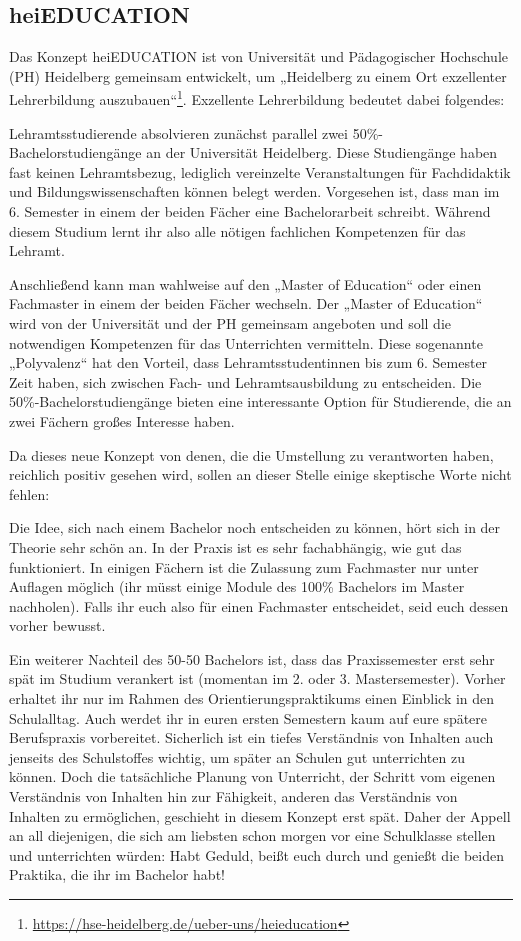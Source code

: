 \subsection{heiEDUCATION}

Das Konzept heiEDUCATION ist von Universität und Pädagogischer Hochschule (PH) Heidelberg gemeinsam entwickelt, um „Heidelberg zu einem Ort exzellenter Lehrerbildung auszubauen“\footnote{\url{https://hse-heidelberg.de/ueber-uns/heieducation}}. Exzellente Lehrerbildung bedeutet dabei folgendes:

Lehramtsstudierende absolvieren zunächst parallel zwei 50\%-Ba\-che\-lor\-stu\-di\-en\-gän\-ge an der Universität Heidelberg. Diese Studiengänge haben fast keinen Lehramtsbezug, lediglich vereinzelte Veranstaltungen für Fachdidaktik und Bildungswissenschaften können belegt werden. Vorgesehen ist, dass man im 6. Semester in einem der beiden Fächer eine Bachelorarbeit schreibt. Während diesem Studium lernt ihr also alle nötigen fachlichen Kompetenzen für das Lehramt.

Anschließend kann man wahlweise auf den „Master of Education“ oder einen Fachmaster in einem der beiden Fächer wechseln. Der „Master of Education“ wird von der Universität und der PH gemeinsam angeboten und soll die notwendigen Kompetenzen für das Unterrichten vermitteln. Diese sogenannte „Polyvalenz“ hat den Vorteil, dass Lehramtsstudentinnen bis zum 6. Semester Zeit haben, sich zwischen Fach- und Lehramtsausbildung zu entscheiden. Die 50\%-Bachelorstudiengänge bieten eine interessante Option für Studierende, die an zwei Fächern großes Interesse haben.

Da dieses neue Konzept von denen, die die Umstellung zu verantworten haben, reichlich positiv gesehen wird, sollen an dieser Stelle einige skeptische Worte nicht fehlen:

Die Idee, sich nach einem Bachelor noch entscheiden zu können, hört sich in der Theorie sehr schön an. In der Praxis ist es sehr fachabhängig, wie gut das funktioniert. In einigen Fächern ist die Zulassung zum Fachmaster nur unter Auflagen möglich (\dah ihr müsst einige Module des 100\% Bachelors im Master nachholen). Falls ihr euch also für einen Fachmaster entscheidet, seid euch dessen vorher bewusst.

Ein weiterer Nachteil des 50-50 Bachelors ist, dass das Praxissemester erst sehr spät im Studium verankert ist (momentan im 2. oder 3. Mastersemester). Vorher erhaltet ihr nur im Rahmen des Orientierungspraktikums einen Einblick in den Schulalltag. Auch werdet ihr in euren ersten Semestern kaum auf eure spätere Berufspraxis vorbereitet. Sicherlich ist ein tiefes Verständnis von Inhalten auch jenseits des Schulstoffes wichtig, um später an Schulen gut unterrichten zu können. Doch die tatsächliche Planung von Unterricht, der Schritt vom eigenen Verständnis von Inhalten hin zur Fähigkeit, anderen das Verständnis von Inhalten zu ermöglichen, geschieht in diesem Konzept erst spät. Daher der Appell an all diejenigen, die sich am liebsten schon morgen vor eine Schulklasse stellen und unterrichten würden: Habt Geduld, beißt euch durch und genießt die beiden Praktika, die ihr im Bachelor habt!

